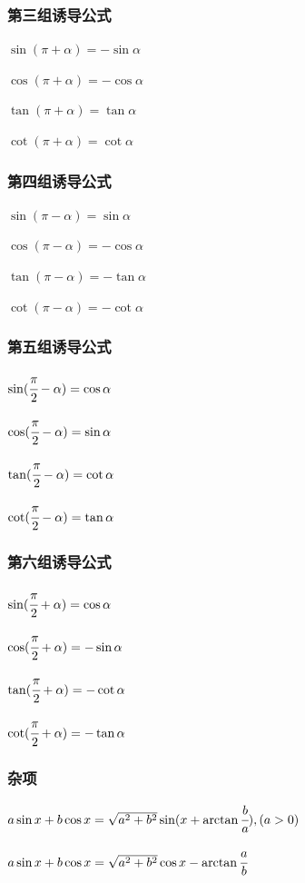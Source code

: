 {{  \subsubsection{第三组诱导公式}{
    $\sin(\pi + \alpha) = -\sin\alpha$

    $\cos(\pi + \alpha) = -\cos\alpha$

    $\tan(\pi + \alpha) = \tan\alpha$

    $\cot(\pi + \alpha) = \cot\alpha$
  }%

  \subsubsection{第四组诱导公式}{
    $\sin(\pi - \alpha) = \sin\alpha$

    $\cos(\pi - \alpha) = -\cos\alpha$

    $\tan(\pi - \alpha) = -\tan\alpha$

    $\cot(\pi - \alpha) = -\cot\alpha$
  }%

  \subsubsection{第五组诱导公式}{
    $\sin(\cfrac{\pi}{2} - \alpha) = \cos\alpha$

    $\cos(\cfrac{\pi}{2} - \alpha) = \sin\alpha$

    $\tan(\cfrac{\pi}{2} - \alpha) = \cot\alpha$

    $\cot(\cfrac{\pi}{2} - \alpha) = \tan\alpha$
  }%

  \subsubsection{第六组诱导公式}{
    $\sin(\cfrac{\pi}{2} + \alpha) = \cos\alpha$

    $\cos(\cfrac{\pi}{2} + \alpha) = -\sin\alpha$

    $\tan(\cfrac{\pi}{2} + \alpha) = -\cot\alpha$

    $\cot(\cfrac{\pi}{2} + \alpha) = -\tan\alpha$
  }%

  \subsubsection{杂项}{
    $a\sin x + b\cos x = \sqrt{a^2 + b^2}\sin(x + \arctan\cfrac{b}{a}),(a > 0)$

    $a\sin x + b\cos x = \sqrt{a^2 + b^2}\cos x - \arctan\cfrac{a}{b}$

}}}

